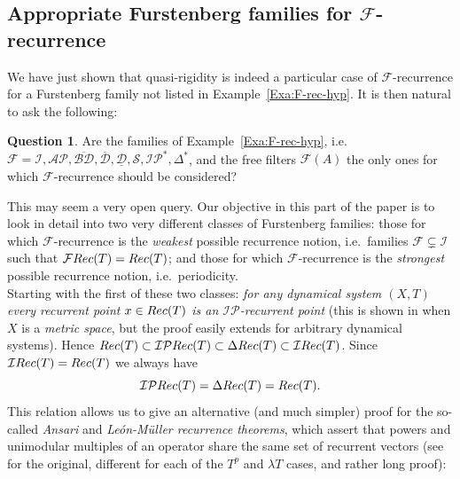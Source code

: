 \documentclass[openright,11pt]{article}
\theoremstyle{plain}
\theoremstyle{definition}
\newtheorem{question}[theorem]{Question}
\newcommand{\AP}{\mathcal{AP}}
\newcommand{\Del}{\Delta}
\newcommand{\Fc}{\mathcal{F}}
\newcommand{\Ic}{\mathcal{I}}
\newcommand{\IP}{\mathcal{IP}}
\newcommand{\Sc}{\mathcal{S}}
\newcommand{\Rec}{\textup{Rec}}
\newcommand{\BDsup}{\overline{\mathcal{BD}}}
\newcommand{\Dsup}{\overline{\mathcal{D}}}
\newcommand{\Dinf}{\underline{\mathcal{D}}}
\begin{document}
\subsection{Appropriate Furstenberg families for $\Fc$-recurrence}\label{SubSec:4.2apropriate.F}%

We have just shown that quasi-rigidity is indeed a particular case of $\Fc$-recurrence for a Furstenberg family not listed in Example~\ref{Exa:F-rec-hyp}. It is then natural to ask the following:

\begin{question}\label{Q:families}
	Are the families of Example~\ref{Exa:F-rec-hyp}, i.e.\ $\Fc = \Ic, \AP, \BDsup, \Dsup, \Dinf, \Sc, \IP^*, \Del^*$, and the free filters $\Fc(A)$ the only ones for which $\Fc$-recurrence should be considered?
\end{question}

This may seem a very open query. Our objective in this part of the paper is to look in detail into two very different classes of Furstenberg families: those for which $\Fc$-recurrence is the {\em weakest} possible recurrence notion, i.e.\ families $\Fc \subsetneq \Ic$ such that $\Fc\Rec(T) = \Rec(T)$; and those for which $\Fc$-recurrence is the {\em strongest} possible recurrence notion, i.e.\ periodicity.\\[-5pt]

Starting with the first of these two classes: {\em for any dynamical system $(X,T)$ every recurrent point $x \in \Rec(T)$ is an $\IP$-recurrent point} (this is shown in \cite[Theorem~2.17]{Furstenberg1981_book} when $X$ is a {\em metric space}, but the proof easily extends for arbitrary dynamical systems). Hence $\Rec(T) \subset \IP\Rec(T) \subset \Del\Rec(T) \subset \Ic\Rec(T)$. Since $\Ic\Rec(T) = \Rec(T)$ we always have
\[
\IP\Rec(T) = \Del\Rec(T) = \Rec(T).
\]
This relation allows us to give an alternative (and much simpler) proof for the so-called {\em Ansari} and {\em Le\'on-M\"uller recurrence theorems}, which assert that powers and unimodular multiples of an operator share the same set of recurrent vectors (see \cite[Proposition~2.3]{CoMaPa2014} for the original, different for each of the $T^p$ and $\lambda T$ cases, and rather long proof):
\end{document}

